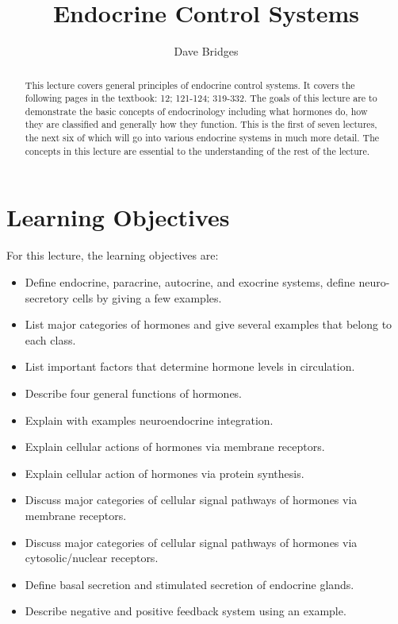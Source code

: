 \documentclass{tufte-handout}
\title{Endocrine Control Systems}
\author{Dave Bridges}
\begin{document}
\maketitle%

\begin{abstract}
\noindent This lecture covers general principles of endocrine control systems.  It covers the following pages in the textbook: 12; 121-124; 319-332\cite{Widmaier2013}.  The goals of this lecture are to demonstrate the basic concepts of endocrinology including what hormones do, how they are classified and generally how they function.  This is the first of seven lectures, the next six of which will go into various endocrine systems in much more detail.  The concepts in this lecture are essential to the understanding of the rest of the lecture.
\end{abstract}

\section{Learning Objectives}
For this lecture, the learning objectives are:
\begin{itemize}
\item Define endocrine, paracrine, autocrine, and exocrine systems, define neuro-secretory cells by giving a few examples.
\item List major categories of hormones and give several examples that belong to each class.
\item List important factors that determine hormone levels in circulation.
\item Describe four general functions of hormones.
\item Explain with examples neuroendocrine integration.
\item Explain cellular actions of hormones via membrane receptors.
\item Explain cellular action of hormones via protein synthesis.
\item Discuss major categories of cellular signal pathways of hormones via membrane receptors.
\item Discuss major categories of cellular signal pathways of hormones via cytosolic/nuclear receptors.
\item Define basal secretion and stimulated secretion of endocrine glands.
\item Describe negative and positive feedback system using an example.
\end{itemize}
\end{document}
